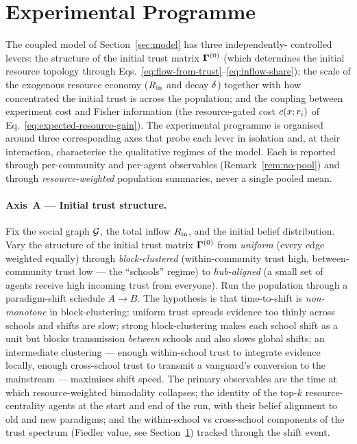 \section{Experimental Programme}
\label{sec:experiments}

The coupled model of Section~\ref{sec:model} has three independently-%
controlled levers: the structure of the initial trust matrix
$\boldsymbol{\Gamma}^{(0)}$ (which determines the initial resource topology
through Eqs.~\ref{eq:flow-from-trust}--\ref{eq:inflow-share}); the
scale of the exogenous resource economy
($R_{\mathrm{in}}$ and decay $\delta$) together with how concentrated the
initial trust is across the population; and the coupling between
experiment cost and Fisher information (the resource-gated cost
$c(x;r_{i})$ of
Eq.~\ref{eq:expected-resource-gain}). The experimental programme is
organised around three corresponding axes that probe each lever in
isolation and, at their interaction, characterise the qualitative
regimes of the model. Each is reported through per-community and
per-agent observables (Remark~\ref{rem:no-pool}) and through
\emph{resource-weighted} population summaries, never a single pooled
mean.

\paragraph{Axis~A --- Initial trust structure.}
Fix the social graph $\mathcal{G}$, the total inflow $R_{\mathrm{in}}$, and the
initial belief distribution. Vary the structure of the initial trust
matrix $\boldsymbol{\Gamma}^{(0)}$ from \emph{uniform} (every edge weighted
equally) through \emph{block-clustered} (within-community trust high,
between-community trust low --- the ``schools'' regime) to
\emph{hub-aligned} (a small set of agents receive high incoming trust
from everyone). Run the population through a paradigm-shift schedule
$A \to B$. The hypothesis is that time-to-shift is \emph{non-monotone}
in block-clustering: uniform trust spreads evidence too thinly across
schools and shifts are slow; strong block-clustering makes each school
shift as a unit but blocks transmission \emph{between} schools and
also slows global shifts; an intermediate clustering --- enough
within-school trust to integrate evidence locally, enough
cross-school trust to transmit a vanguard's conversion to the
mainstream --- maximises shift speed. The primary observables are the
time at which resource-weighted bimodality collapses; the identity of
the top-$k$ resource-centrality agents at the start and end of the
run, with their belief alignment to old and new paradigms; and the
within-school vs cross-school components of the trust spectrum
(Fiedler value, see Section~\ref{sec:experiments}) tracked through the
shift event.

